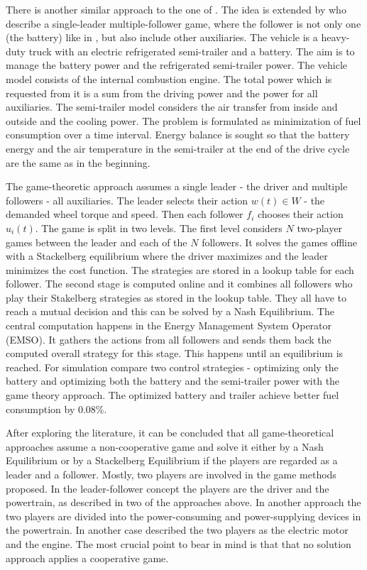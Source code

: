 
There is another similar approach to the one of \citet{dextreit2014game}. The idea is extended by \citet{chen2014game} who describe a single-leader multiple-follower game, where the follower is not only one (the battery) like in \citet{dextreit2014game}, but also include other auxiliaries. The vehicle is a heavy-duty truck with an electric refrigerated semi-trailer and a battery. The aim is to manage the battery power and the refrigerated semi-trailer power. The vehicle model consists of the internal combustion engine. The total power which is requested from it is a sum from the driving power and the power for all auxiliaries. The semi-trailer model considers the air transfer from inside and outside and the cooling power. The problem is formulated as minimization of fuel consumption over a time interval. Energy balance is sought so that the battery energy and the air temperature in the semi-trailer at the end of the drive cycle are the same as in the beginning.

The game-theoretic approach assumes a single leader - the driver and multiple followers - all auxiliaries. The leader selects their action $w(t) \in W$ - the demanded wheel torque and speed. Then each follower $f_i$ chooses their action $u_i(t)$. The game is split in two levels. The first level considers $N$ two-player games between the leader and each of the $N$ followers. It solves the games offline with a Stackelberg equilibrium where the driver maximizes and the leader minimizes the cost function. The strategies are stored in a lookup table for each follower. The second stage is computed online and it combines all followers who play their Stakelberg strategies as stored in the lookup table. They all have to reach a mutual decision and this can be solved by a Nash Equilibrium. The central computation happens in the Energy Management System Operator (EMSO). It gathers the actions from all followers and sends them back the computed overall strategy for this stage. This happens until an equilibrium is reached. For simulation \citet{chen2014game} compare two control strategies - optimizing only the battery and optimizing both the battery and the semi-trailer power with the game theory approach. The optimized battery and trailer achieve better fuel consumption by 0.08\%.


After exploring the literature, it can be concluded that all game-theoretical approaches assume a non-cooperative game and solve it either by a Nash Equilibrium or by a Stackelberg Equilibrium if the players are regarded as a leader and a follower. Mostly, two players are involved in the game methods proposed. In the leader-follower concept the players are the driver and the powertrain, as described in two of the approaches above. In another approach the two players are divided into the power-consuming and power-supplying devices in the powertrain. In another case \citet{chin2010design} described the two players as the electric motor and the engine. The most crucial point to bear in mind is that that no solution approach applies a cooperative game.

